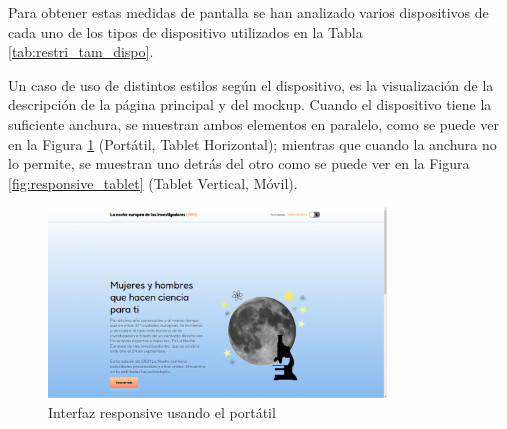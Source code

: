 \begin{table}[h]
\centering
{}
\caption{Restricciones de tamaño de pantalla para los dispositivos}
\label{tab:restri_tam_dispo}
\end{table}

Para obtener estas medidas de pantalla se han analizado varios dispositivos de cada uno de los tipos de dispositivo utilizados en la Tabla \ref{tab:restri_tam_dispo}.

Un caso de uso de distintos estilos según el dispositivo, es la visualización de la descripción de la página principal y del mockup. Cuando el dispositivo tiene la suficiente anchura, se muestran ambos elementos en paralelo, como se puede ver en la Figura \ref{fig:responsive_portatil} (Portátil, Tablet Horizontal); mientras que cuando la anchura no lo permite, se muestran uno detrás del otro como se puede ver en la Figura \ref{fig:responsive_tablet} (Tablet Vertical, Móvil).

\begin{figure}[H]
\centering
\includegraphics[width=0.8\textwidth]{imagenes/07_Implementacion/responsive_portatil.png}
\caption{Interfaz responsive usando el portátil}
\label{fig:responsive_portatil}
\end{figure}

